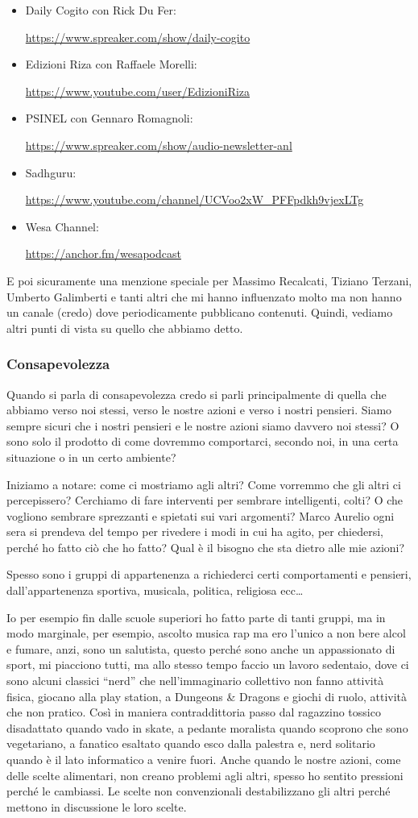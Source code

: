 \documentclass[12pt]{book} %
\begin{document}
\begin{itemize}
\item Daily Cogito con Rick Du Fer: \raggedright\url{https://www.spreaker.com/show/daily-cogito} 
\item Edizioni Riza con Raffaele Morelli: \raggedright\url{https://www.youtube.com/user/EdizioniRiza}
\item PSINEL con Gennaro Romagnoli: \raggedright\url{https://www.spreaker.com/show/audio-newsletter-anl} 
\item Sadhguru: \raggedright\url{https://www.youtube.com/channel/UCVoo2xW\_PFFpdkh9vjexLTg} 
\item Wesa Channel: \raggedright\url{https://anchor.fm/wesapodcast} 
\end{itemize}
E poi sicuramente una menzione speciale per Massimo Recalcati, Tiziano Terzani, Umberto Galimberti e tanti altri che mi
hanno influenzato molto ma non hanno un canale (credo) dove periodicamente pubblicano contenuti. Quindi, vediamo altri
punti di vista su quello che abbiamo detto.

\subsubsection{Consapevolezza}
Quando si parla di consapevolezza credo si parli principalmente di quella che abbiamo verso noi stessi, verso le nostre azioni e
verso i nostri pensieri. Siamo sempre sicuri che i nostri pensieri e le nostre azioni siamo davvero noi stessi? O sono
solo il prodotto di come dovremmo comportarci, secondo noi, in una certa situazione o in un certo ambiente? 

Iniziamo a notare: come ci mostriamo agli altri? Come vorremmo che gli altri ci percepissero? Cerchiamo di fare
interventi per sembrare intelligenti, colti? O che vogliono sembrare sprezzanti e spietati sui vari argomenti? Marco
Aurelio ogni sera si prendeva del tempo per rivedere i modi in cui ha agito, per chiedersi, perché ho fatto ciò che ho
fatto? Qual è il bisogno che sta dietro alle mie azioni? 

Spesso sono i gruppi di appartenenza a richiederci certi comportamenti e pensieri,
dall'appartenenza sportiva, musicala, politica, religiosa ecc…

Io per esempio fin dalle scuole superiori ho fatto parte di tanti gruppi, ma in modo marginale, per esempio,
ascolto musica rap ma ero l'unico a non bere alcol e fumare, anzi, sono un salutista,
questo perché sono anche un appassionato di sport, mi piacciono tutti, ma allo stesso tempo faccio un lavoro sedentaio, dove ci sono alcuni classici “nerd” che nell'immaginario collettivo non fanno attività fisica, giocano alla play station, a Dungeons \& Dragons e giochi di ruolo, attività che non pratico. Così in maniera contraddittoria passo dal ragazzino tossico disadattato quando
vado in skate, a pedante moralista quando scoprono che sono vegetariano, a fanatico esaltato quando esco dalla palestra
e, nerd solitario quando è il lato informatico a venire fuori.
Anche quando le nostre azioni, come delle scelte alimentari, non creano problemi agli altri, spesso ho sentito pressioni perché le cambiassi.
Le scelte non convenzionali destabilizzano gli altri perché mettono in discussione le loro scelte.
\end{document}
